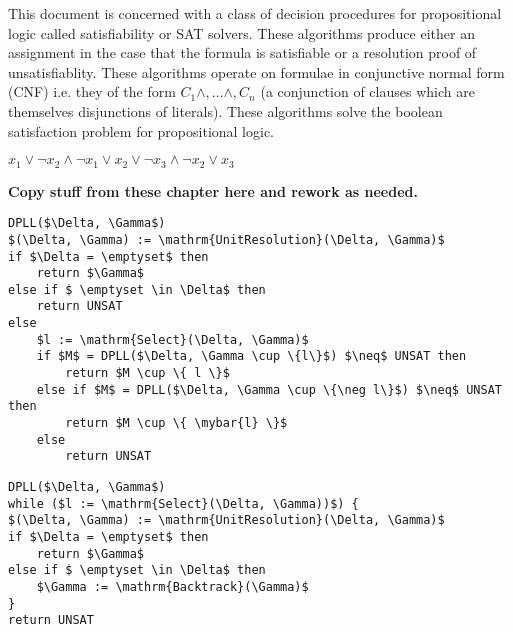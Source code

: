 This document is concerned with a class of decision procedures for propositional logic called satisfiability or SAT solvers. These algorithms produce either an assignment in the case that the formula is satisfiable or a resolution proof of unsatisfiablity. These algorithms operate on formulae in conjunctive normal form (CNF) i.e. they of the form $C_1 \wedge, \ldots \wedge, C_n$  (a conjunction of clauses which are themselves disjunctions of literals).
These algorithms solve the boolean satisfaction problem for propositional logic.

  $x_1 \vee \neg x_2 \wedge \neg x_1 \vee x_2 \vee \neg x_3 \wedge  \neg x_2 \vee x_3$

\textbf{Copy stuff from these chapter here and rework as needed.}

\begin{lstlisting}[caption = Example Recursive DPLL Algorithm,mathescape, label = cl:dpllrecalg]
DPLL($\Delta, \Gamma$)
$(\Delta, \Gamma) := \mathrm{UnitResolution}(\Delta, \Gamma)$
if $\Delta = \emptyset$ then
    return $\Gamma$
else if $ \emptyset \in \Delta$ then
    return UNSAT
else
    $l := \mathrm{Select}(\Delta, \Gamma)$
    if $M$ = DPLL($\Delta, \Gamma \cup \{l\}$) $\neq$ UNSAT then
        return $M \cup \{ l \}$ 
    else if $M$ = DPLL($\Delta, \Gamma \cup \{\neg l\}$) $\neq$ UNSAT then 
        return $M \cup \{ \mybar{l} \}$ 
    else
        return UNSAT
\end{lstlisting}

\begin{lstlisting}[caption = Example Iterative DPLL Algorithm,mathescape, label = cl:dplliteralg]
DPLL($\Delta, \Gamma$)
while ($l := \mathrm{Select}(\Delta, \Gamma))$) {
$(\Delta, \Gamma) := \mathrm{UnitResolution}(\Delta, \Gamma)$
if $\Delta = \emptyset$ then
    return $\Gamma$
else if $ \emptyset \in \Delta$ then
    $\Gamma := \mathrm{Backtrack}(\Gamma)$
}
return UNSAT
\end{lstlisting}

